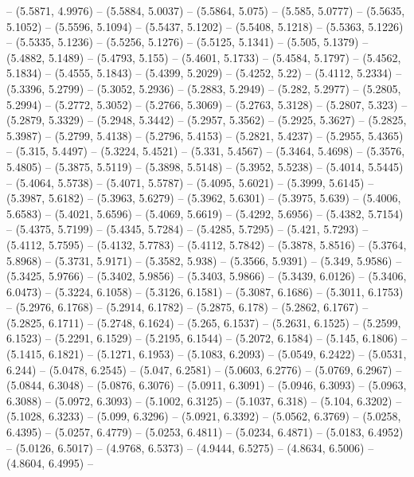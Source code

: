 {   -- (5.5871, 4.9976) -- (5.5884, 5.0037) -- (5.5864, 5.075) -- (5.585, 5.0777)
   -- (5.5635, 5.1052) -- (5.5596, 5.1094) -- (5.5437, 5.1202) -- (5.5408, 
  5.1218) -- (5.5363, 5.1226) -- (5.5335, 5.1236) -- (5.5256, 5.1276) -- 
  (5.5125, 5.1341) -- (5.505, 5.1379) -- (5.4882, 5.1489) -- (5.4793, 5.155) -- 
  (5.4601, 5.1733) -- (5.4584, 5.1797) -- (5.4562, 5.1834) -- (5.4555, 5.1843) 
  -- (5.4399, 5.2029) -- (5.4252, 5.22) -- (5.4112, 5.2334) -- (5.3396, 5.2799) 
  -- (5.3052, 5.2936) -- (5.2883, 5.2949) -- (5.282, 5.2977) -- (5.2805, 5.2994)
   -- (5.2772, 5.3052) -- (5.2766, 5.3069) -- (5.2763, 5.3128) -- (5.2807, 
  5.323) -- (5.2879, 5.3329) -- (5.2948, 5.3442) -- (5.2957, 5.3562) -- (5.2925,
   5.3627) -- (5.2825, 5.3987) -- (5.2799, 5.4138) -- (5.2796, 5.4153) -- 
  (5.2821, 5.4237) -- (5.2955, 5.4365) -- (5.315, 5.4497) -- (5.3224, 5.4521) --
   (5.331, 5.4567) -- (5.3464, 5.4698) -- (5.3576, 5.4805) -- (5.3875, 5.5119) 
  -- (5.3898, 5.5148) -- (5.3952, 5.5238) -- (5.4014, 5.5445) -- (5.4064, 
  5.5738) -- (5.4071, 5.5787) -- (5.4095, 5.6021) -- (5.3999, 5.6145) -- 
  (5.3987, 5.6182) -- (5.3963, 5.6279) -- (5.3962, 5.6301) -- (5.3975, 5.639) --
   (5.4006, 5.6583) -- (5.4021, 5.6596) -- (5.4069, 5.6619) -- (5.4292, 5.6956) 
  -- (5.4382, 5.7154) -- (5.4375, 5.7199) -- (5.4345, 5.7284) -- (5.4285, 
  5.7295) -- (5.421, 5.7293) -- (5.4112, 5.7595) -- (5.4132, 5.7783) -- (5.4112,
   5.7842) -- (5.3878, 5.8516) -- (5.3764, 5.8968) -- (5.3731, 5.9171) -- 
  (5.3582, 5.938) -- (5.3566, 5.9391) -- (5.349, 5.9586) -- (5.3425, 5.9766) -- 
  (5.3402, 5.9856) -- (5.3403, 5.9866) -- (5.3439, 6.0126) -- (5.3406, 6.0473) 
  -- (5.3224, 6.1058) -- (5.3126, 6.1581) -- (5.3087, 6.1686) -- (5.3011, 
  6.1753) -- (5.2976, 6.1768) -- (5.2914, 6.1782) -- (5.2875, 6.178) -- (5.2862,
   6.1767) -- (5.2825, 6.1711) -- (5.2748, 6.1624) -- (5.265, 6.1537) -- 
  (5.2631, 6.1525) -- (5.2599, 6.1523) -- (5.2291, 6.1529) -- (5.2195, 6.1544) 
  -- (5.2072, 6.1584) -- (5.145, 6.1806) -- (5.1415, 6.1821) -- (5.1271, 6.1953)
   -- (5.1083, 6.2093) -- (5.0549, 6.2422) -- (5.0531, 6.244) -- (5.0478, 
  6.2545) -- (5.047, 6.2581) -- (5.0603, 6.2776) -- (5.0769, 6.2967) -- (5.0844,
   6.3048) -- (5.0876, 6.3076) -- (5.0911, 6.3091) -- (5.0946, 6.3093) -- 
  (5.0963, 6.3088) -- (5.0972, 6.3093) -- (5.1002, 6.3125) -- (5.1037, 6.318) --
   (5.104, 6.3202) -- (5.1028, 6.3233) -- (5.099, 6.3296) -- (5.0921, 6.3392) --
   (5.0562, 6.3769) -- (5.0258, 6.4395) -- (5.0257, 6.4779) -- (5.0253, 6.4811) 
  -- (5.0234, 6.4871) -- (5.0183, 6.4952) -- (5.0126, 6.5017) -- (4.9768, 
  6.5373) -- (4.9444, 6.5275) -- (4.8634, 6.5006) -- (4.8604, 6.4995) -- 
}
